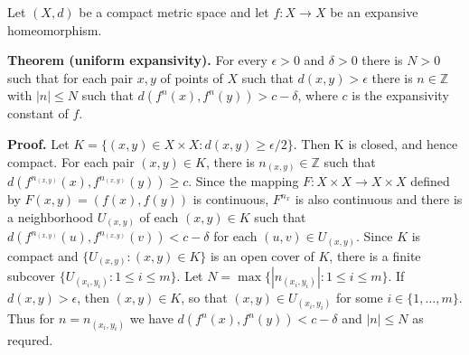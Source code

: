 \documentclass[12pt]{article}
\newcommand{\Z}{\mathbb{Z}}
\begin{document}
Let $(X,d)$ be a compact metric space and let $f\colon X\to X$ be an expansive homeomorphism. 

\textbf{Theorem (uniform expansivity).} For every $\epsilon>0$ and $\delta>0$ there is $N>0$ such that for each pair $x,y$ of points of $X$ such that $d(x,y)>\epsilon$ there is $n\in \Z$ with $|n|\leq N$ such that $d(f^n(x),f^n(y)) > c-\delta$, where $c$ is the expansivity constant of $f$.

\textbf{Proof.} Let $K=\{(x,y)\in X\times X: d(x,y)\geq \epsilon/2\}$. Then K is closed, and hence compact. For each pair $(x,y)\in K$, there is $n_{(x,y)}\in \Z$ such that $d(f^{n_{(x,y)}}(x),f^{n_{(x,y)}}(y))\geq c$. Since the mapping $F\colon X\times X\to X\times X$ defined by $F(x,y)=(f(x),f(y))$ is continuous, $F^{n_x}$ is also continuous and there is a neighborhood $U_{(x,y)}$ of each $(x,y)\in K$ such that $d(f^{n_{(x,y)}}(u),f^{n_{(x,y)}}(v))<c-\delta$ for each $(u,v)\in U_{(x,y)}$. Since $K$ is compact and $\{U_{(x,y)}:(x,y)\in K\}$ is an open cover of $K$, there is a finite subcover $\{U_{(x_i,y_i)} : 1\leq i \leq m\}$. Let $N=\max\{|n_{(x_i,y_i)}|:1\leq i\leq m\}$. If $d(x,y)>\epsilon$, then $(x,y)\in K$, so that $(x,y)\in U_{(x_i,y_i)}$ for some $i\in \{1,\dots,m\}$. Thus for $n=n_{(x_i,y_i)}$ we have $d(f^n(x),f^n(y))<c-\delta$ and $|n|\leq N$ as requred.
\end{document}
